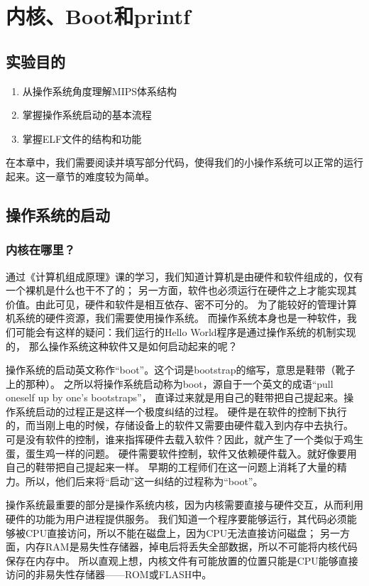 \chapter{内核、Boot和printf}

\section{实验目的}
  \begin{enumerate}
    \item 从操作系统角度理解MIPS体系结构
    \item 掌握操作系统启动的基本流程
    \item 掌握ELF文件的结构和功能
  \end{enumerate}
在本章中，我们需要阅读并填写部分代码，使得我们的小操作系统可以正常的运行起来。这一章节的难度较为简单。
    
\section{操作系统的启动}

\subsection{内核在哪里？}
通过《计算机组成原理》课的学习，我们知道计算机是由硬件和软件组成的，仅有一个裸机是什么也干不了的；
另一方面，软件也必须运行在硬件之上才能实现其价值。由此可见，硬件和软件是相互依存、密不可分的。
为了能较好的管理计算机系统的硬件资源，我们需要使用操作系统。
而操作系统本身也是一种软件，我们可能会有这样的疑问：我们运行的Hello World程序是通过操作系统的机制实现的，
那么操作系统这种软件又是如何启动起来的呢？

\begin{note}
操作系统的启动英文称作“boot”。这个词是bootstrap的缩写，意思是鞋带（靴子上的那种）。
之所以将操作系统启动称为boot，源自于一个英文的成语“pull oneself up by one's bootstraps”，
直译过来就是用自己的鞋带把自己提起来。操作系统启动的过程正是这样一个极度纠结的过程。
硬件是在软件的控制下执行的，而当刚上电的时候，存储设备上的软件又需要由硬件载入到内存中去执行。
可是没有软件的控制，谁来指挥硬件去载入软件？因此，就产生了一个类似于鸡生蛋，蛋生鸡一样的问题。
硬件需要软件控制，软件又依赖硬件载入。就好像要用自己的鞋带把自己提起来一样。
早期的工程师们在这一问题上消耗了大量的精力。所以，他们后来将“启动”这一纠结的过程称为“boot”。
\end{note}

操作系统最重要的部分是操作系统内核，因为内核需要直接与硬件交互，从而利用硬件的功能为用户进程提供服务。
我们知道一个程序要能够运行，其代码必须能够被CPU直接访问，所以不能在磁盘上，因为CPU无法直接访问磁盘；
另一方面，内存RAM是易失性存储器，掉电后将丢失全部数据，所以不可能将内核代码保存在内存中。
所以直观上想，内核文件有可能放置的位置只能是CPU能够直接访问的非易失性存储器——ROM或FLASH中。

